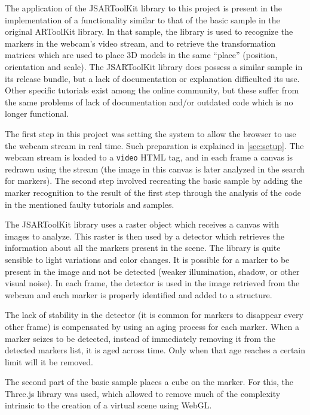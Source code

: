 \label{sec:jsartoolkit}

The application of the JSARToolKit library to this project is present in the implementation of a functionality similar to that of the basic sample in the original ARToolKit library. In that sample, the library is used to recognize the markers in the webcam's video stream, and to retrieve the transformation matrices which are used to place 3D models in the same ``place'' (position, orientation and scale). The JSARToolKit library does possess a similar sample in its release bundle, but a lack of documentation or explanation difficulted its use. Other specific tutorials exist among the online community, but these suffer from the same problems of lack of documentation and/or outdated code which is no longer functional.

The first step in this project was setting the system to allow the browser to use the webcam stream in real time. Such preparation is explained in \cref{sec:setup}. The webcam stream is loaded to a \texttt{video} HTML tag, and in each frame a canvas is redrawn using the stream (the image in this canvas is later analyzed in the search for markers). The second step involved recreating the basic sample by adding the marker recognition to the result of the first step through the analysis of the code in the mentioned faulty tutorials and samples.

The JSARToolKit library uses a raster object which receives a canvas with images to analyze. This raster is then used by a detector which retrieves the information about all the markers present in the scene. The library is quite sensible to light variations and color changes. It is possible for a marker to be present in the image and not be detected (weaker illumination, shadow, or other visual noise). In each frame, the detector is used in the image retrieved from the webcam and each marker is properly identified and added to a structure.

The lack of stability in the detector (it is common for markers to disappear every other frame) is compensated by using an aging process for each marker. When a marker seizes to be detected, instead of immediately removing it from the detected markers list, it is aged across time. Only when that age reaches a certain limit will it be removed.

The second part of the basic sample places a cube on the marker. For this, the Three.js library was used, which allowed to remove much of the complexity intrinsic to the creation of a virtual scene using WebGL.

